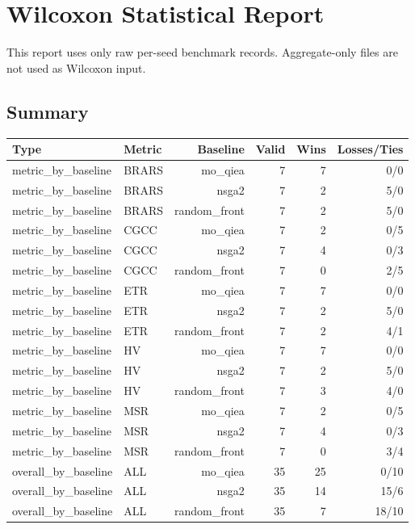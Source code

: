 \section{Wilcoxon Statistical Report}
This report uses only raw per-seed benchmark records. Aggregate-only files are not used as Wilcoxon input.
\subsection{Summary}
\begin{tabular}{llrrrr}
Type & Metric & Baseline & Valid & Wins & Losses/Ties \\
\hline
metric\_by\_baseline & BRARS & mo\_qiea & 7 & 7 & 0/0 \\
metric\_by\_baseline & BRARS & nsga2 & 7 & 2 & 5/0 \\
metric\_by\_baseline & BRARS & random\_front & 7 & 2 & 5/0 \\
metric\_by\_baseline & CGCC & mo\_qiea & 7 & 2 & 0/5 \\
metric\_by\_baseline & CGCC & nsga2 & 7 & 4 & 0/3 \\
metric\_by\_baseline & CGCC & random\_front & 7 & 0 & 2/5 \\
metric\_by\_baseline & ETR & mo\_qiea & 7 & 7 & 0/0 \\
metric\_by\_baseline & ETR & nsga2 & 7 & 2 & 5/0 \\
metric\_by\_baseline & ETR & random\_front & 7 & 2 & 4/1 \\
metric\_by\_baseline & HV & mo\_qiea & 7 & 7 & 0/0 \\
metric\_by\_baseline & HV & nsga2 & 7 & 2 & 5/0 \\
metric\_by\_baseline & HV & random\_front & 7 & 3 & 4/0 \\
metric\_by\_baseline & MSR & mo\_qiea & 7 & 2 & 0/5 \\
metric\_by\_baseline & MSR & nsga2 & 7 & 4 & 0/3 \\
metric\_by\_baseline & MSR & random\_front & 7 & 0 & 3/4 \\
overall\_by\_baseline & ALL & mo\_qiea & 35 & 25 & 0/10 \\
overall\_by\_baseline & ALL & nsga2 & 35 & 14 & 15/6 \\
overall\_by\_baseline & ALL & random\_front & 35 & 7 & 18/10 \\
\end{tabular}
